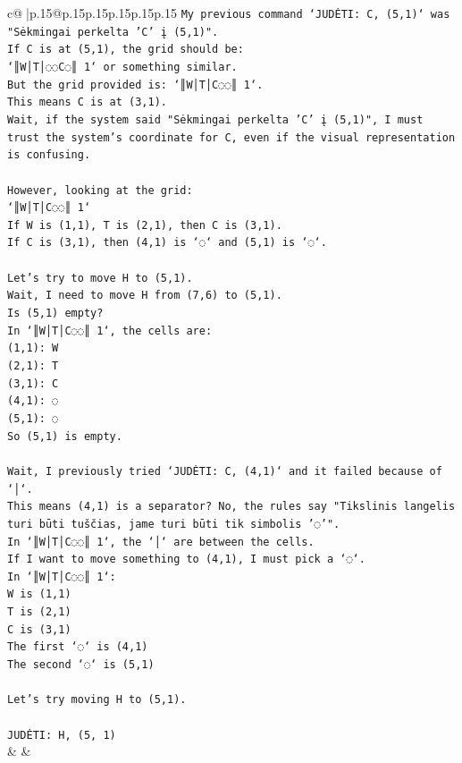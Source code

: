\documentclass{article}
\begin{document}
{\begin{supertabular}{c@{$\;$}|p{.15\linewidth}@{}p{.15\linewidth}p{.15\linewidth}p{.15\linewidth}p{.15\linewidth}p{.15\linewidth}}
{{{\texttt{My previous command `JUDĖTI: C, (5,1)` was "Sėkmingai perkelta 'C' į (5,1)".} \\
\texttt{If C is at (5,1), the grid should be:} \\
\texttt{`║W│T│◌◌C◌║ 1` or something similar.} \\
\texttt{But the grid provided is: `║W│T│C◌◌║ 1`.} \\
\texttt{This means C is at (3,1).} \\
\texttt{Wait, if the system said "Sėkmingai perkelta 'C' į (5,1)", I must trust the system's coordinate for C, even if the visual representation is confusing.} \\
\\ 
\texttt{However, looking at the grid:} \\
\texttt{`║W│T│C◌◌║ 1`} \\
\texttt{If W is (1,1), T is (2,1), then C is (3,1).} \\
\texttt{If C is (3,1), then (4,1) is `◌` and (5,1) is `◌`.} \\
\\ 
\texttt{Let's try to move H to (5,1).} \\
\texttt{Wait, I need to move H from (7,6) to (5,1).} \\
\texttt{Is (5,1) empty?} \\
\texttt{In `║W│T│C◌◌║ 1`, the cells are:} \\
\texttt{(1,1): W} \\
\texttt{(2,1): T} \\
\texttt{(3,1): C} \\
\texttt{(4,1): ◌} \\
\texttt{(5,1): ◌} \\
\texttt{So (5,1) is empty.} \\
\\ 
\texttt{Wait, I previously tried `JUDĖTI: C, (4,1)` and it failed because of `│`.} \\
\texttt{This means (4,1) is a separator? No, the rules say "Tikslinis langelis turi būti tuščias, jame turi būti tik simbolis '◌'".} \\
\texttt{In `║W│T│C◌◌║ 1`, the `│` are between the cells.} \\
\texttt{If I want to move something to (4,1), I must pick a `◌`.} \\
\texttt{In `║W│T│C◌◌║ 1`:} \\
\texttt{W is (1,1)} \\
\texttt{T is (2,1)} \\
\texttt{C is (3,1)} \\
\texttt{The first `◌` is (4,1)} \\
\texttt{The second `◌` is (5,1)} \\
\\ 
\texttt{Let's try moving H to (5,1).} \\
\\ 
\texttt{JUDĖTI: H, (5, 1)} \\
            }
        }
    }
    & & \\ \\


\end{supertabular}}
\end{document}
